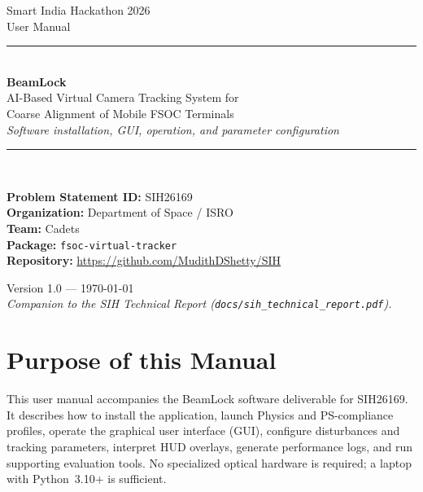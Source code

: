 \documentclass[11pt,a4paper]{article}
\begin{document}
\begin{titlepage}
\centering
\vspace*{1.0cm}
{\color{BeamMuted}\large Smart India Hackathon 2026}\\[0.35cm]
{\color{BeamTeal}\Large User Manual}\\[1.0cm]
{\rule{\textwidth}{1.2pt}}\\[0.45cm]
{\LARGE\bfseries\color{BeamInk} BeamLock}\\[0.3cm]
{\large AI-Based Virtual Camera Tracking System for\\
Coarse Alignment of Mobile FSOC Terminals}\\[0.35cm]
{\normalsize\textit{Software installation, GUI, operation, and parameter configuration}}\\[0.45cm]
{\rule{\textwidth}{1.2pt}}\\[1.0cm]

\begin{minipage}{0.88\textwidth}
\raggedright
\textbf{Problem Statement ID:} SIH26169\\[0.2cm]
\textbf{Organization:} Department of Space / ISRO\\[0.2cm]
\textbf{Team:} Cadets\\[0.2cm]
\textbf{Package:} \texttt{fsoc-virtual-tracker}\\[0.2cm]
\textbf{Repository:} \url{https://github.com/MudithDShetty/SIH}
\end{minipage}

\vfill
{\large Version 1.0 --- \today}\\[0.4cm]
{\small\textit{Companion to the SIH Technical Report (\texttt{docs/sih\_technical\_report.pdf}).}}
\end{titlepage}

\tableofcontents
\newpage

\section{Purpose of this Manual}

This user manual accompanies the BeamLock software deliverable for SIH26169.
It describes how to install the application, launch Physics and PS-compliance profiles, operate the graphical user interface (GUI), configure disturbances and tracking parameters, interpret HUD overlays, generate performance logs, and run supporting evaluation tools.
No specialized optical hardware is required; a laptop with Python~3.10+ is sufficient.
\end{document}
